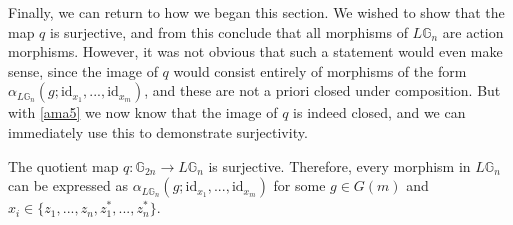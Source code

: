 Finally, we can return to how we began this section. We wished to show that the map $q$ is surjective, and from this conclude that all morphisms of $L\mathbb{G}_n$ are action morphisms. However, it was not obvious that such a statement would even make sense, since the image of $q$ would consist entirely of morphisms of the form $\alpha_{L\mathbb{G}_n}(g; \mathrm{id}_{x_1}, ..., \mathrm{id}_{x_m})$, and these are not a priori closed under composition. But with \cref{ama5} we now know that the image of $q$ is indeed closed, and we can immediately use this to demonstrate surjectivity.

\begin{prop}\label{allmapsaction} The quotient map $q: \mathbb{G}_{2n} \to L\mathbb{G}_n$ is surjective. Therefore, every morphism in $L\mathbb{G}_n$ can be expressed as $\alpha_{L\mathbb{G}_n}(g; \mathrm{id}_{x_1}, ..., \mathrm{id}_{x_m})$ for some $g \in G(m)$ and $x_i \in \{z_1, ..., z_n, z^*_1, ..., z^*_n  \}$.
\end{prop}
